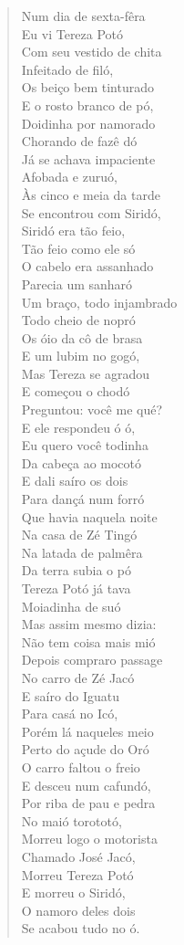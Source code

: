 \begin{verse}
Num dia de sexta-fêra\\
Eu vi Tereza Potó\\
Com seu vestido de chita\\
Infeitado de filó,\\
Os beiço bem tinturado\\
E o rosto branco de pó,\\
Doidinha por namorado\\
Chorando de fazê dó\\
Já se achava impaciente\\
Afobada e zuruó,\\
Às cinco e meia da tarde\\
Se encontrou com Siridó,\\
Siridó era tão feio,\\
Tão feio como ele só\\
O cabelo era assanhado\\
Parecia um sanharó\\
Um braço, todo injambrado\\
Todo cheio de nopró\\
Os óio da cô de brasa\\
E um lubim no gogó,\\
Mas Tereza se agradou\\
E começou o chodó\\
Preguntou: você me qué?\\
E ele respondeu ó ó,\\
Eu quero você todinha\\
Da cabeça ao mocotó\\
E dali saíro os dois\\
Para dançá num forró\\
Que havia naquela noite\\
Na casa de Zé Tingó\\
Na latada de palmêra\\
Da terra subia o pó\\
Tereza Potó já tava\\
Moiadinha de suó\\
Mas assim mesmo dizia:\\
Não tem coisa mais mió\\
Depois compraro passage\\
No carro de Zé Jacó\\
E saíro do Iguatu\\
Para casá no Icó,\\
Porém lá naqueles meio\\
Perto do açude do Oró\\
O carro faltou o freio\\
E desceu num cafundó,\\
Por riba de pau e pedra\\
No maió torototó,\\
Morreu logo o motorista\\
Chamado José Jacó,\\
Morreu Tereza Potó\\
E morreu o Siridó,\\
O namoro deles dois\\
Se acabou tudo no ó.
\end{verse}

